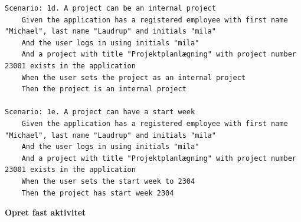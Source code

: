 \begin{listing}[H]
\begin{verbatim}
Scenario: 1d. A project can be an internal project
    Given the application has a registered employee with first name "Michael", last name "Laudrup" and initials "mila"
    And the user logs in using initials "mila"
    And a project with title "Projektplanlægning" with project number 23001 exists in the application
    When the user sets the project as an internal project
    Then the project is an internal project

Scenario: 1e. A project can have a start week
    Given the application has a registered employee with first name "Michael", last name "Laudrup" and initials "mila"
    And the user logs in using initials "mila"
    And a project with title "Projektplanlægning" with project number 23001 exists in the application
    When the user sets the start week to 2304
    Then the project has start week 2304
    \end{verbatim}
\end{listing}
\textbf{Opret fast aktivitet}
